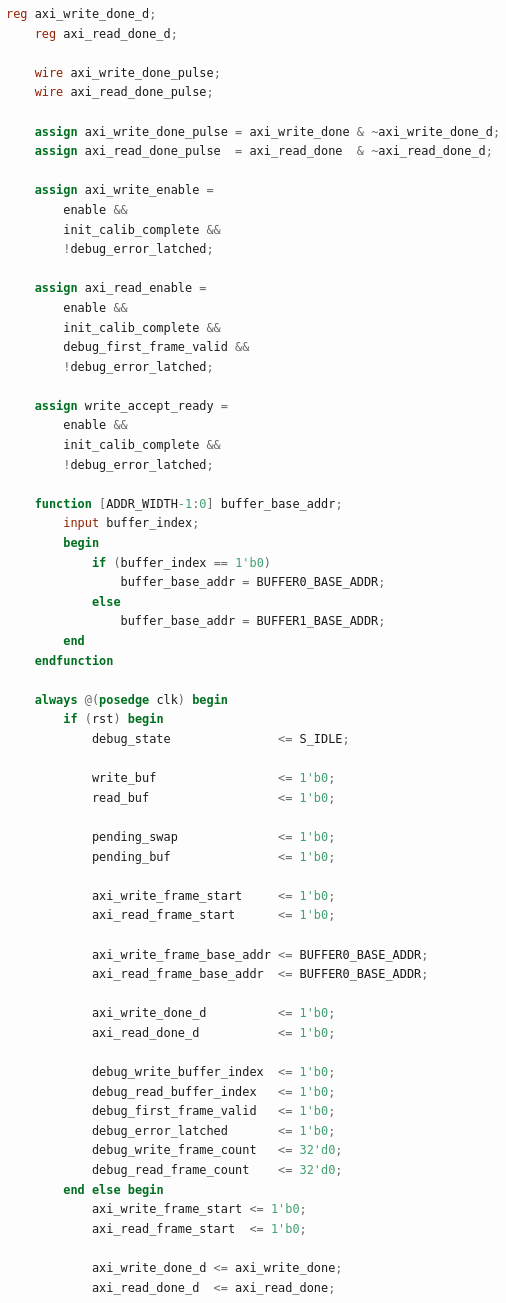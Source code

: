 \begin{lstlisting}[language=Verilog, title={Kode \emph{Base Address Controller} untuk mengatur \emph{double buffer memory}}, label={code:double-biffer-mem}]
    reg axi_write_done_d;
    reg axi_read_done_d;

    wire axi_write_done_pulse;
    wire axi_read_done_pulse;

    assign axi_write_done_pulse = axi_write_done & ~axi_write_done_d;
    assign axi_read_done_pulse  = axi_read_done  & ~axi_read_done_d;

    assign axi_write_enable =
        enable &&
        init_calib_complete &&
        !debug_error_latched;

    assign axi_read_enable =
        enable &&
        init_calib_complete &&
        debug_first_frame_valid &&
        !debug_error_latched;
        
    assign write_accept_ready =
        enable &&
        init_calib_complete &&
        !debug_error_latched;

    function [ADDR_WIDTH-1:0] buffer_base_addr;
        input buffer_index;
        begin
            if (buffer_index == 1'b0)
                buffer_base_addr = BUFFER0_BASE_ADDR;
            else
                buffer_base_addr = BUFFER1_BASE_ADDR;
        end
    endfunction

    always @(posedge clk) begin
        if (rst) begin
            debug_state               <= S_IDLE;

            write_buf                 <= 1'b0;
            read_buf                  <= 1'b0;

            pending_swap              <= 1'b0;
            pending_buf               <= 1'b0;

            axi_write_frame_start     <= 1'b0;
            axi_read_frame_start      <= 1'b0;

            axi_write_frame_base_addr <= BUFFER0_BASE_ADDR;
            axi_read_frame_base_addr  <= BUFFER0_BASE_ADDR;

            axi_write_done_d          <= 1'b0;
            axi_read_done_d           <= 1'b0;

            debug_write_buffer_index  <= 1'b0;
            debug_read_buffer_index   <= 1'b0;
            debug_first_frame_valid   <= 1'b0;
            debug_error_latched       <= 1'b0;
            debug_write_frame_count   <= 32'd0;
            debug_read_frame_count    <= 32'd0;
        end else begin
            axi_write_frame_start <= 1'b0;
            axi_read_frame_start  <= 1'b0;

            axi_write_done_d <= axi_write_done;
            axi_read_done_d  <= axi_read_done;


\end{lstlisting}
